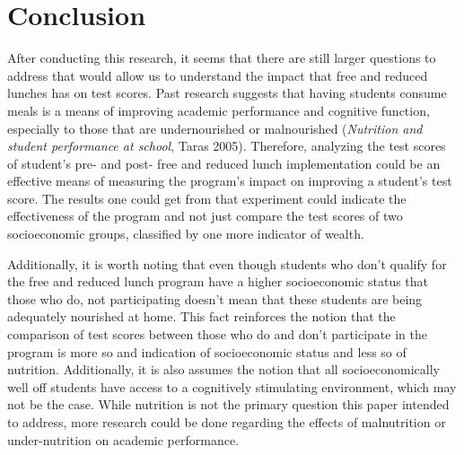 \documentclass{article}
\begin{document}
\section{Conclusion}
After conducting this research, it seems that there are still larger questions to address that would allow us to understand the impact that free and reduced lunches has on test scores. Past research suggests that having students consume meals is a means of improving academic performance and cognitive function, especially to those that are undernourished or malnourished (\textit{Nutrition and student performance at school}, Taras 2005). Therefore, analyzing the test scores of student's pre- and post- free and reduced lunch implementation could be an effective means of measuring the program's impact on improving a student's test score. The results one could get from that experiment could indicate the effectiveness of the program and not just compare the test scores of two socioeconomic groups, classified by one more indicator of wealth.

\par Additionally, it is worth noting that even though students who don't qualify for the free and reduced lunch program have a higher socioeconomic status that those who do, not participating doesn't mean that these students are being adequately nourished at home. This fact reinforces the notion that the comparison of test scores between those who do and don't participate in the program is more so and indication of socioeconomic status and less so of nutrition. Additionally, it is also assumes the notion that all socioeconomically well off students have access to a cognitively stimulating environment, which may not be the case. While nutrition is not the primary question this paper intended to address, more research could be done regarding the effects of malnutrition or under-nutrition on academic performance.
\end{document}
